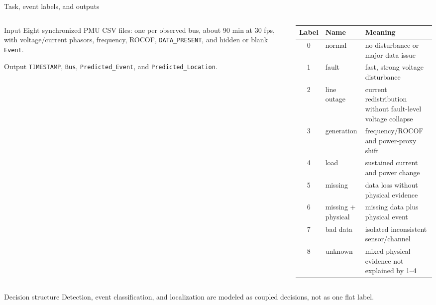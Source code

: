 ﻿\documentclass[10pt,aspectratio=169]{beamer}
\newcommand{\code}[1]{\texttt{\footnotesize #1}}
\begin{document}
\begin{frame}{Task, event labels, and outputs}
\small
\begin{columns}[T,totalwidth=\textwidth]
\begin{column}{0.45\textwidth}
\begin{block}{Input}
Eight synchronized PMU CSV files: one per observed bus, about 90 min at 30 fps, with voltage/current phasors, frequency, ROCOF, \code{DATA\_PRESENT}, and hidden or blank \code{Event}.
\end{block}
\begin{alertblock}{Output}
\code{TIMESTAMP}, \code{Bus}, \code{Predicted\_Event}, and \code{Predicted\_Location}.
\end{alertblock}
\end{column}
\begin{column}{0.51\textwidth}
\centering
\scriptsize
\begin{tabular}{clp{}}
\toprule
\textbf{Label} & \textbf{Name} & \textbf{Meaning}\\
\midrule
0 & normal & no disturbance or major data issue\\
1 & fault & fast, strong voltage disturbance\\
2 & line outage & current redistribution without fault-level voltage collapse\\
3 & generation & frequency/ROCOF and power-proxy shift\\
4 & load & sustained current and power change\\
5 & missing & data loss without physical evidence\\
6 & missing + physical & missing data plus physical event\\
7 & bad data & isolated inconsistent sensor/channel\\
8 & unknown & mixed physical evidence not explained by 1--4\\
\bottomrule
\end{tabular}
\end{column}
\end{columns}
\vspace{-1mm}
\begin{exampleblock}{Decision structure}
Detection, event classification, and localization are modeled as coupled decisions, not as one flat label.
\end{exampleblock}
\end{frame}
\end{document}
